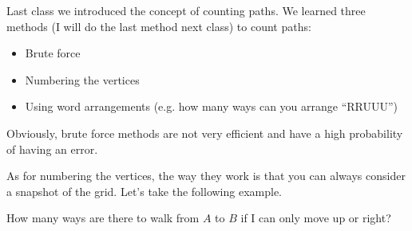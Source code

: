Last class we introduced the concept of counting paths. We learned three methods (I will do the last method next class) to count paths:
\begin{itemize}
    \item Brute force 
    \item Numbering the vertices
    \item Using word arrangements (e.g. how many ways can you arrange ``RRUUU'')
\end{itemize}
Obviously, brute force methods are not very efficient and have a high probability of having an error.

As for numbering the vertices, the way they work is that you can always consider a snapshot of the grid. Let's take the following example.

\begin{problem}
How many ways are there to walk from $A$ to $B$ if I can only move up or right?
\begin{center}
\end{center}
\end{problem}

